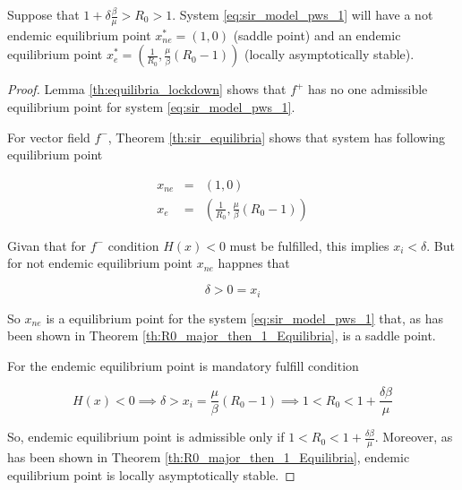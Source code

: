 \begin{theorem}
Suppose that $ 1+\delta\frac{\beta}{\mu} > R_0 > 1$. System \ref{eq:sir_model_pws_1} will have a not endemic equilibrium point $x_{ne}^*=(1,0)$ (saddle point) and an endemic equilibrium point $x_{e}^*=\left(\frac{1}{R_0}, \frac{\mu}{\beta}\left(R_0 - 1\right)\right)$ (locally asymptotically stable).
\end{theorem}

\begin{proof}
Lemma \ref{th:equilibria_lockdown} shows that $f^+$ has no one admissible equilibrium point for system \ref{eq:sir_model_pws_1}.

For vector field $f^-$, Theorem \ref{th:sir_equilibria} shows that system has following equilibrium point

\begin{equation}
    \begin{array}{ccc}
    x_{ne} &=& (1,0) \\
    x_{e} &=& \left(\frac{1}{R_0}, \frac{\mu}{\beta}\left(R_0 - 1\right)\right)
    \end{array}
\end{equation}

Givan that for $f^-$ condition $H(x) < 0$ must be fulfilled, this implies $x_i < \delta$. But for not endemic equilibrium point $x_{ne}$ happnes that

\begin{equation}
    \delta > 0 = x_i
\end{equation}

So $x_{ne}$ is a equilibrium point for the system \ref{eq:sir_model_pws_1} that, as has been shown in Theorem \ref{th:R0_major_then_1_Equilibria}, is a saddle point.

For the endemic equilibrium point is mandatory fulfill condition

\begin{equation}
    H(x) < 0 \implies \delta > x_i = \frac{\mu}{\beta}\left(R_0 - 1\right) \implies 1 < R_0 < 1 + \frac{\delta\beta}{\mu}
\end{equation}

So, endemic equilibrium point is admissible only if $1 < R_0 < 1 + \frac{\delta\beta}{\mu}$. Moreover, as has been shown in Theorem \ref{th:R0_major_then_1_Equilibria}, endemic equilibrium point is locally asymptotically stable.
\end{proof}